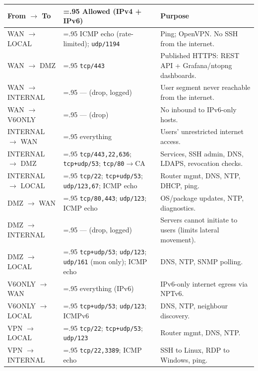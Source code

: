 \documentclass[11pt,a4paper]{article}
\newcommand{\code}[1]{\texttt{#1}}
\begin{document}
\begin{table}[H]
\centering
\footnotesize
\setlength{\tabcolsep}{4pt}
\begin{tabularx}{\linewidth}{@{}l >{\hsize=.95\hsize}X >{\hsize=1.05\hsize}X@{}}
\toprule
\textbf{From $\rightarrow$ To} & \textbf{Allowed (IPv4 + IPv6)} & \textbf{Purpose} \\
\midrule
WAN $\rightarrow$ LOCAL      & ICMP echo (rate-limited); \code{udp/1194} & Ping; OpenVPN. No SSH from the internet. \\
WAN $\rightarrow$ DMZ        & \code{tcp/443}                            & Published HTTPS: REST API + Grafana/ntopng dashboards. \\
WAN $\rightarrow$ INTERNAL   & --- (drop, logged)                        & User segment never reachable from the internet. \\
WAN $\rightarrow$ V6ONLY     & --- (drop)                                & No inbound to IPv6-only hosts. \\
INTERNAL $\rightarrow$ WAN   & everything                                & Users' unrestricted internet access. \\
INTERNAL $\rightarrow$ DMZ   & \code{tcp/443,22,636}; \code{tcp+udp/53}; \code{tcp/80}$\to$CA & Services, SSH admin, DNS, LDAPS, revocation checks. \\
INTERNAL $\rightarrow$ LOCAL & \code{tcp/22}; \code{tcp+udp/53}; \code{udp/123,67}; ICMP echo & Router mgmt, DNS, NTP, DHCP, ping. \\
DMZ $\rightarrow$ WAN        & \code{tcp/80,443}; \code{udp/123}; ICMP echo & OS/package updates, NTP, diagnostics. \\
DMZ $\rightarrow$ INTERNAL   & --- (drop, logged)                        & Servers cannot initiate to users (limits lateral movement). \\
DMZ $\rightarrow$ LOCAL      & \code{tcp+udp/53}; \code{udp/123}; \code{udp/161} (mon only); ICMP echo & DNS, NTP, SNMP polling. \\
V6ONLY $\rightarrow$ WAN     & everything (IPv6)                         & IPv6-only internet egress via NPTv6. \\
V6ONLY $\rightarrow$ LOCAL   & \code{tcp+udp/53}; \code{udp/123}; ICMPv6 & DNS, NTP, neighbour discovery. \\
VPN $\rightarrow$ LOCAL      & \code{tcp/22}; \code{tcp+udp/53}; \code{udp/123} & Router mgmt, DNS, NTP. \\
VPN $\rightarrow$ INTERNAL   & \code{tcp/22,3389}; ICMP echo             & SSH to Linux, RDP to Windows, ping. \\

\end{tabularx}
\end{table}
\end{document}
